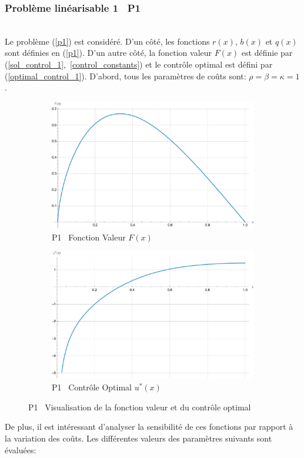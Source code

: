 \subsubsection{Problème linéarisable 1 \textemdash~P1}\phantom{}\\
Le problème (\ref{p1}) est considéré. D'un côté, les fonctions $r(x)$, $b(x)$ et $q(x)$ sont définies en (\ref{p1}). D'un autre côté, la fonction valeur $F(x)$ est définie par (\ref{sol_control_1},~\ref{control_constants}) et le contrôle optimal est défini par (\ref{optimal_control_1}). D'abord, tous les paramètres de coûts sont: $\rho=\beta=\kappa=1$.
\begin{figure}[htb]
    \centering
    \begin{subfigure}{0.45\linewidth}
        \includegraphics[width=\linewidth]{img/validation/P1/p1_value.pdf}
        \caption{P1 \textemdash~Fonction Valeur $F(x)$}\label{fig:ValueVisualisation1}
    \end{subfigure}
    \hfill
    \begin{subfigure}{0.45\linewidth}
        \includegraphics[width=\linewidth]{img/validation/P1/p1_control.pdf}
        \caption{P1 \textemdash~Contrôle Optimal $u^*(x)$}\label{fig:ControlVisualisation1}
    \end{subfigure}
    \caption{P1 \textemdash~Visualisation de la fonction valeur et du contrôle optimal}\label{fig:ValueControlComparison1}
\end{figure}\FloatBarrier De plus, il est intéressant d'analyser la sensibilité de ces fonctions par rapport à la variation des coûts. Les différentes valeurs des paramètres suivants sont évaluées:
